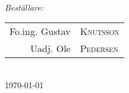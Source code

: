 \begin{titlepage}
\begin{minipage}[t]{0.45\textwidth}
\begin{flushleft}
\end{flushleft}
\end{minipage}
~
\begin{minipage}[t]{0.45\textwidth}
\begin{flushright} \large
\emph{Beställare:} \\
\setlength{\tabcolsep}{2pt}
\begin{tabular}[]{rl}
Fo.ing. Gustav &\textsc{Knutsson} \\
Uadj. Ole &\textsc{Pedersen}
\end{tabular}
\end{flushright}
\end{minipage}\\[4cm]



{\large \today}\\[3cm] %


 

\vfill %

\end{titlepage}